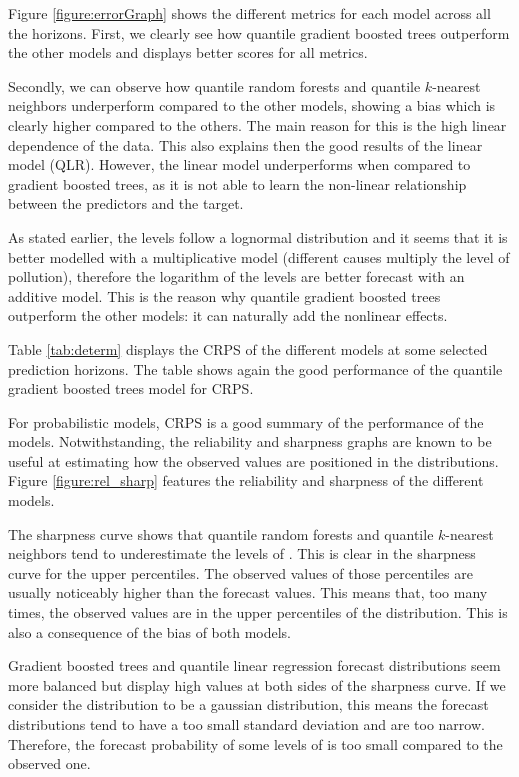 \documentclass[a4paper,twocolumn,5p]{elsarticle}
\begin{document}
Figure \ref{figure:errorGraph} shows the different metrics for each
model across all the horizons. First, we clearly see how 
quantile gradient
boosted trees outperform the other models and displays better scores
for all metrics.

Secondly, we can observe how quantile random forests and 
quantile $k$-nearest
neighbors underperform compared to the other models, showing a bias
which is clearly higher compared to the others.  The main reason for
this is the high linear dependence of the data. This also explains
then the good results of the linear model (QLR).  However, the linear
model underperforms when compared to gradient boosted trees, as it is
not able to learn the non-linear relationship between the predictors
and the target.

As stated earlier, the \no levels follow a lognormal
distribution and it seems that it is better modelled with a
multiplicative model (different causes multiply the level of
pollution), therefore the logarithm of the \no levels
are better forecast with an additive model. 
This is the reason why
quantile gradient boosted trees outperform 
the other models: it can naturally
add the nonlinear effects.

Table \ref{tab:determ} displays the CRPS of the different models at
some selected prediction horizons. The table shows again the good
performance of the quantile 
gradient boosted trees model for CRPS.

For probabilistic models, CRPS is a good summary of the performance of
the models. Notwithstanding, the reliability and sharpness graphs are
known to be useful at estimating how the observed values are
positioned in the distributions.  Figure \ref{figure:rel_sharp}
features the reliability and sharpness of the different models.

The sharpness curve shows that quantile random forests 
and quantile $k$-nearest
neighbors tend to underestimate the levels of
\no. This is clear in the sharpness curve for the
upper percentiles. The observed values of those percentiles are
usually noticeably higher than the forecast values. This means that,
too many times, the observed values are in the upper percentiles of
the distribution. This is also a consequence of the bias of both
models.

Gradient boosted trees and quantile linear regression forecast
distributions seem more balanced but display high values at both sides
of the sharpness curve.  If we consider the distribution to be a
gaussian distribution, this means the forecast distributions tend to
have a too small standard deviation and are too narrow. Therefore, the
forecast probability of some levels of \no is too
small compared to the observed one.
\end{document}
